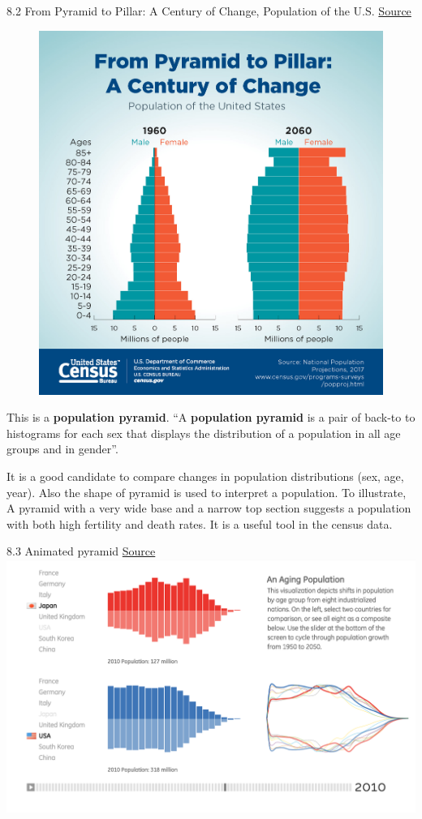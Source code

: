 \documentclass[]{book}
\theoremstyle{definition}
\theoremstyle{definition}
\theoremstyle{definition}
\theoremstyle{remark}
\begin{document}
8.2 From Pyramid to Pillar: A Century of Change, Population of the U.S.
\href{https://www.census.gov/library/visualizations/2018/comm/century-of-change.html}{Source}

\begin{figure}
\centering
\includegraphics{images/Pyramid.jpg}
\caption{}
\end{figure}

This is a \textbf{population pyramid}. ``A \textbf{population pyramid}
is a pair of back-to to histograms for each sex that displays the
distribution of a population in all age groups and in gender''.

It is a good candidate to compare changes in population distributions
(sex, age, year). Also the shape of pyramid is used to interpret a
population. To illustrate, A pyramid with a very wide base and a narrow
top section suggests a population with both high fertility and death
rates. It is a useful tool in the census data.

8.3 Animated pyramid \href{https://fathom.info/aging/}{Source}
\includegraphics{images/3_1.png}
\end{document}
